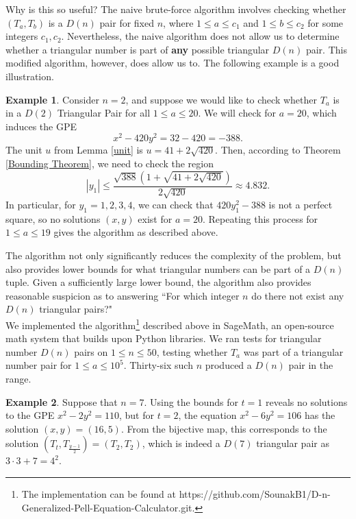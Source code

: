\documentclass[12pt]{amsart}
\theoremstyle{theorem}
\theoremstyle{definition}
\newtheorem{example}{Example}
\theoremstyle{plain}
\begin{document}
Why is this so useful? The naive brute-force algorithm involves checking whether $(T_a, T_b)$ is a $D(n)$ pair for fixed $n$, where $1 \le a \le c_1$ and $1 \le b \le c_2$ for some integers $c_1, c_2$. Nevertheless, the naive algorithm does not allow us to determine whether a triangular number is part of \textbf{any} possible triangular $D(n)$ pair. This modified algorithm, however, does allow us to. The following example is a good illustration.

\begin{example}
    Consider $n = 2$, and suppose we would like to check whether $T_a$ is in a $D(2)$ Triangular Pair for all $1 \le a \le 20$. We will check for $a = 20$, which induces the GPE $$x^2 - 420y^2 = 32 - 420 = -388.$$ The unit $u$ from Lemma \ref{unit} is $u = 41 + 2 \sqrt{420}$. Then, according to Theorem \ref{Bounding Theorem}, we need to check the region $$|y_1| \le \frac{\sqrt{388} \left(1 + \sqrt{41 + 2 \sqrt{420}} \right)}{2 \sqrt{420}} \approx 4.832.$$ In particular, for $y_1 = 1, 2, 3, 4$, we can check that $420y_1^2 - 388$ is not a perfect square, so no solutions $(x,y)$ exist for $a = 20$. Repeating this process for $1 \le a \le 19$ gives the algorithm as described above.
\end{example}

The algorithm not only significantly reduces the complexity of the problem, but also provides lower bounds for what triangular numbers can be part of a $D(n)$ tuple. Given a sufficiently large lower bound, the algorithm also provides reasonable suspicion as to answering ``For which integer $n$ do there not exist any $D(n)$ triangular pairs?"
\\

We implemented the algorithm\footnote{The implementation can be found at https://github.com/SounakB1/D-n-Generalized-Pell-Equation-Calculator.git.} 
 described above in SageMath, an open-source math system that builds upon Python libraries. We ran tests for triangular number $D(n)$ pairs on $1 \le n \le 50$, testing whether $T_a$ was part of a triangular number pair for $1 \le a \le 10^5$. Thirty-six such $n$ produced a $D(n)$ pair in the range.
 
 \begin{example}
     Suppose that $n = 7$. Using the bounds for $t=1$ reveals no solutions to the GPE $x^2 - 2y^2 = 110$, but for $t = 2$, the equation $x^2 - 6y^2 = 106$ has the solution $(x,y) = (16,5)$. From the bijective map, this corresponds to the solution $(T_{t}, T_{\frac{y-1}{2}}) = (T_2, T_2)$, which is indeed a $D(7)$ triangular pair as $3 \cdot 3 + 7 = 4^2$.
 \end{example}
 
\end{document}
